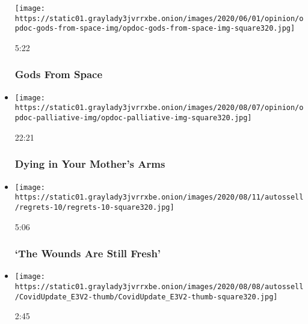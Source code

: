 \begin{itemize}
  \texttt{[image: https://static01.graylady3jvrrxbe.onion/images/2020/06/01/opinion/opdoc-gods-from-space-img/opdoc-gods-from-space-img-square320.jpg]}

  5:22

  \hypertarget{gods-from-space}{%
  \subsubsection{Gods From Space}\label{gods-from-space}}
\item
  \href{https://www.nytimes3xbfgragh.onion/video/opinion/100000007249913/dying-in-your-mothers-arms.html?action=click\&module=video-series-bar\&region=header\&pgtype=Article\&playlistId=video/opinion}{}

  \texttt{[image: https://static01.graylady3jvrrxbe.onion/images/2020/08/07/opinion/opdoc-palliative-img/opdoc-palliative-img-square320.jpg]}

  22:21

  \hypertarget{dying-in-your-mothers-arms}{%
  \subsubsection{Dying in Your Mother's
  Arms}\label{dying-in-your-mothers-arms}}
\item
  \href{https://www.nytimes3xbfgragh.onion/video/opinion/100000007228098/coronavirus-doctors-nurses-healthcare.html?action=click\&module=video-series-bar\&region=header\&pgtype=Article\&playlistId=video/opinion}{}

  \texttt{[image: https://static01.graylady3jvrrxbe.onion/images/2020/08/11/autossell/regrets-10/regrets-10-square320.jpg]}

  5:06

  \hypertarget{the-wounds-are-still-fresh}{%
  \subsubsection{`The Wounds Are Still
  Fresh'}\label{the-wounds-are-still-fresh}}
\item
  \href{https://www.nytimes3xbfgragh.onion/video/opinion/100000007278127/coronavirus-vaccine-update.html?action=click\&module=video-series-bar\&region=header\&pgtype=Article\&playlistId=video/opinion}{}

  \texttt{[image: https://static01.graylady3jvrrxbe.onion/images/2020/08/08/autossell/CovidUpdate\_E3V2-thumb/CovidUpdate\_E3V2-thumb-square320.jpg]}

  2:45


\end{itemize}
